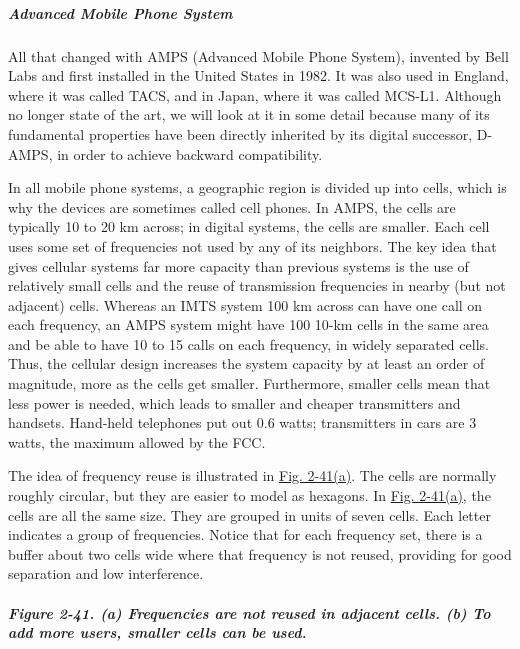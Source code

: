 \protect\hypertarget{0130661023_ch02lev1sec6.htmlux5cux23ch02lev3sec19}{}{}

\subparagraph{Advanced Mobile Phone System}

All that changed with {AMPS} ({Advanced Mobile Phone System}), invented
by Bell Labs and first installed in the United States in 1982. It was
also used in England, where it was called TACS, and in Japan, where it
was called MCS-L1. Although no longer state of the art, we will look at
it in some detail because many of its fundamental properties have been
directly inherited by its digital successor, D-AMPS, in order to achieve
backward compatibility.

In all mobile phone systems, a geographic region is divided up into
{cells}, which is why the devices are sometimes called cell phones. In
AMPS, the cells are typically 10 to 20 km across; in digital systems,
the cells are smaller. Each cell uses some set of frequencies not used
by any of its neighbors. The key idea that gives cellular systems far
more capacity than previous systems is the use of relatively small cells
and the reuse of transmission frequencies in nearby (but not adjacent)
cells. Whereas an IMTS system 100 km across can have one call on each
frequency, an AMPS system might have 100 10-km cells in the same area
and be able to have 10 to 15 calls on each frequency, in widely
separated cells. Thus, the cellular design increases the system capacity
by at least an order of magnitude, more as the cells get smaller.
Furthermore, smaller cells mean that less power is needed, which leads
to smaller and cheaper transmitters and handsets. Hand-held telephones
put out 0.6 watts; transmitters in cars are 3 watts, the maximum allowed
by the FCC.

The idea of frequency reuse is illustrated in
\protect\hyperlink{0130661023_ch02lev1sec6.htmlux5cux23ch02fig41}{Fig.
2-41(a)}. The cells are normally roughly circular, but they are easier
to model as hexagons. In
\protect\hyperlink{0130661023_ch02lev1sec6.htmlux5cux23ch02fig41}{Fig.
2-41(a)}, the cells are all the same size. They are grouped in units of
seven cells. Each letter indicates a group of frequencies. Notice that
for each frequency set, there is a buffer about two cells wide where
that frequency is not reused, providing for good separation and low
interference.

\subparagraph[Figure 2-41. (a) Frequencies are not reused in adjacent
cells. (b) To add more users, smaller cells can be
used.]{\texorpdfstring{\protect\hypertarget{0130661023_ch02lev1sec6.htmlux5cux23ch02fig41}{}{}Figure
2-41. (a) Frequencies are not reused in adjacent cells. (b) To add more
users, smaller cells can be
used.}{Figure 2-41. (a) Frequencies are not reused in adjacent cells. (b) To add more users, smaller cells can be used.}}

